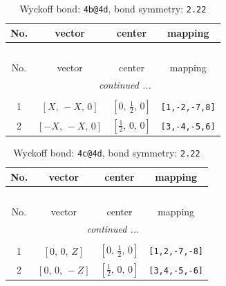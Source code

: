 \documentclass[fleqn,8pt]{jsarticle}
\begin{document}
\renewcommand{\arraystretch}{1.2}
\begin{longtable}{cccc}
\caption{Wyckoff bond: {\tt 4b@4d}, bond symmetry: {\tt 2.22}}
 \\
 \hline \hline
No. & vector & center & mapping \\ \hline \endfirsthead

\multicolumn{3}{l}{\tablename\ \thetable{}} \\
 \hline \hline
No. & vector & center & mapping \\ \hline \endhead

 \hline \hline
\multicolumn{3}{r}{\footnotesize\it continued ...} \\ \endfoot

 \hline \hline
\multicolumn{3}{r}{} \\ \endlastfoot

1 & $\left[ X,\, - X,\, 0 \right]$ & $\left[ 0,\, \frac{1}{2},\, 0 \right]$ & {\tt [1,-2,-7,8]} \\ \hline
2 & $\left[ - X,\, - X,\, 0 \right]$ & $\left[ \frac{1}{2},\, 0,\, 0 \right]$ & {\tt [3,-4,-5,6]} \\
\end{longtable}
\renewcommand{\arraystretch}{1.2}
\begin{longtable}{cccc}
\caption{Wyckoff bond: {\tt 4c@4d}, bond symmetry: {\tt 2.22}}
 \\
 \hline \hline
No. & vector & center & mapping \\ \hline \endfirsthead

\multicolumn{3}{l}{\tablename\ \thetable{}} \\
 \hline \hline
No. & vector & center & mapping \\ \hline \endhead

 \hline \hline
\multicolumn{3}{r}{\footnotesize\it continued ...} \\ \endfoot

 \hline \hline
\multicolumn{3}{r}{} \\ \endlastfoot

1 & $\left[ 0,\, 0,\, Z \right]$ & $\left[ 0,\, \frac{1}{2},\, 0 \right]$ & {\tt [1,2,-7,-8]} \\ \hline
2 & $\left[ 0,\, 0,\, - Z \right]$ & $\left[ \frac{1}{2},\, 0,\, 0 \right]$ & {\tt [3,4,-5,-6]} \\
\end{longtable}
\renewcommand{\arraystretch}{1.2}
\end{document}
